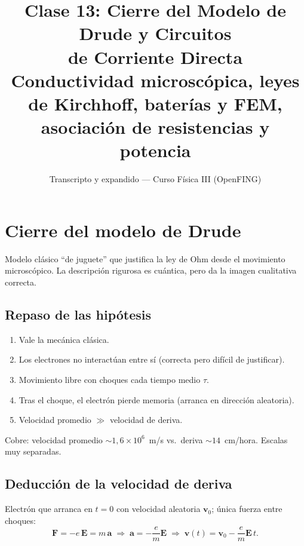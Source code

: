 \documentclass[12pt,a4paper]{article}
\title{\textbf{Clase 13: Cierre del Modelo de Drude y Circuitos \\
        de Corriente Directa}\\[0.3em]
        \large{Conductividad microscópica, leyes de Kirchhoff, baterías
              y FEM, asociación de resistencias y potencia}}
\author{Transcripto y expandido --- Curso Física III (OpenFING)}
\date{}
\begin{document}
\maketitle
\thispagestyle{empty}
\newpage

\tableofcontents
\newpage

\section{Cierre del modelo de Drude}

Modelo clásico \enquote{de juguete} que justifica la ley de Ohm desde el
movimiento microscópico. La descripción rigurosa es cuántica, pero da la
imagen cualitativa correcta.

\subsection{Repaso de las hipótesis}

\begin{enumerate}[nosep]
  \item Vale la mecánica clásica.
  \item Los electrones no interactúan entre sí (correcta pero difícil de
        justificar).
  \item Movimiento libre con choques cada tiempo medio $\tau$.
  \item Tras el choque, el electrón pierde memoria (arranca en dirección
        aleatoria).
  \item Velocidad promedio $\gg$ velocidad de deriva.
\end{enumerate}

\begin{notebox}
  Cobre: velocidad promedio $\sim 1{,}6\times10^{6}$~m/s vs.\ deriva
  $\sim 14$~cm/hora. Escalas muy separadas.
\end{notebox}

\subsection{Deducción de la velocidad de deriva}

Electrón que arranca en $t=0$ con velocidad aleatoria $\mathbf{v}_0$;
única fuerza entre choques:
\[
\mathbf{F} = -e\,\mathbf{E} = m\,\mathbf{a}
\;\Longrightarrow\;
\mathbf{a} = -\frac{e}{m}\mathbf{E}
\;\Longrightarrow\;
\mathbf{v}(t) = \mathbf{v}_0 - \frac{e}{m}\mathbf{E}\, t.
\]
\end{document}
